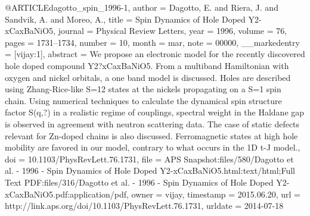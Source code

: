 @ARTICLE{dagotto_spin_1996-1,
  author = {Dagotto, E. and Riera, J. and Sandvik, A. and Moreo, A.},
  title = {Spin {Dynamics} of {Hole} {Doped} {Y}2-{xCaxBaNiO}5},
  journal = {Physical Review Letters},
  year = {1996},
  volume = {76},
  pages = {1731--1734},
  number = {10},
  month = mar,
  note = {00000},
  __markedentry = {[vijay:1]},
  abstract = {We propose an electronic model for the recently discovered hole doped
	compound Y2?xCaxBaNiO5. From a multiband Hamiltonian with oxygen
	and nickel orbitals, a one band model is discussed. Holes are described
	using Zhang-Rice-like S=12 states at the nickels propagating on a
	S=1 spin chain. Using numerical techniques to calculate the dynamical
	spin structure factor S(q,?) in a realistic regime of couplings,
	spectral weight in the Haldane gap is observed in agreement with
	neutron scattering data. The case of static defects relevant for
	Zn-doped chains is also discussed. Ferromagnetic states at high hole
	mobility are favored in our model, contrary to what occurs in the
	1D t-J model.},
  doi = {10.1103/PhysRevLett.76.1731},
  file = {APS Snapshot:files/580/Dagotto et al. - 1996 - Spin Dynamics of Hole Doped Y2-xCaxBaNiO5.html:text/html;Full Text PDF:files/316/Dagotto et al. - 1996 - Spin Dynamics of Hole Doped Y2-xCaxBaNiO5.pdf:application/pdf},
  owner = {vijay},
  timestamp = {2015.06.20},
  url = {http://link.aps.org/doi/10.1103/PhysRevLett.76.1731},
  urldate = {2014-07-18}
}

